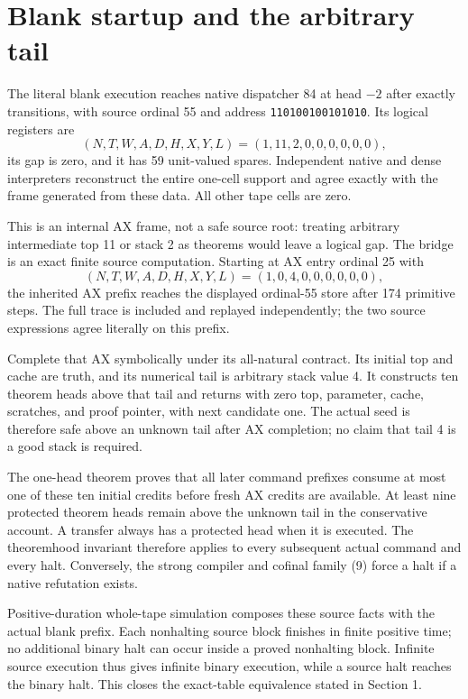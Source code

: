 \documentclass[11pt]{article}
\begin{document}
\section{Blank startup and the arbitrary tail}
\label{sec:boot}

The literal blank execution reaches native dispatcher 84 at head $-2$ after exactly \BootSteps{} transitions, with source ordinal 55 and address
\texttt{110100100101010}. Its logical registers are
\[
 (N,T,W,A,D,H,X,Y,L)=(1,11,2,0,0,0,0,0,0),
\]
its gap is zero, and it has 59 unit-valued spares. Independent native and dense interpreters reconstruct the entire one-cell support and agree exactly with the frame generated from these data. All other tape cells are zero.

This is an internal AX frame, not a safe source root: treating arbitrary intermediate top 11 or stack 2 as theorems would leave a logical gap. The bridge is an exact finite source computation. Starting at AX entry ordinal 25 with
\[
 (N,T,W,A,D,H,X,Y,L)=(1,0,4,0,0,0,0,0,0),
\]
the inherited AX prefix reaches the displayed ordinal-55 store after 174 primitive steps. The full trace is included and replayed independently; the two source expressions agree literally on this prefix.

Complete that AX symbolically under its all-natural contract. Its initial top and cache are truth, and its numerical tail is arbitrary stack value 4. It constructs ten theorem heads above that tail and returns with zero top, parameter, cache, scratches, and proof pointer, with next candidate one. The actual seed is therefore safe above an unknown tail after AX completion; no claim that tail 4 is a good stack is required.

The one-head theorem proves that all later command prefixes consume at most one of these ten initial credits before fresh AX credits are available. At least nine protected theorem heads remain above the unknown tail in the conservative account. A transfer always has a protected head when it is executed. The theoremhood invariant therefore applies to every subsequent actual command and every halt. Conversely, the strong compiler and cofinal family (9) force a halt if a native refutation exists.

Positive-duration whole-tape simulation composes these source facts with the actual blank prefix. Each nonhalting source block finishes in finite positive time; no additional binary halt can occur inside a proved nonhalting block. Infinite source execution thus gives infinite binary execution, while a source halt reaches the binary halt. This closes the exact-table equivalence stated in Section 1.
\end{document}
